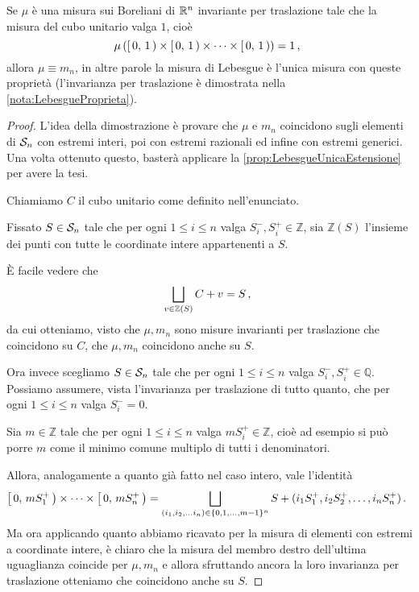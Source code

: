 \begin{theorem}\label{thm:LebesgueUnicaInvarianteTraslazione}
	Se $\mu$ è una misura sui Boreliani di $\R^n$ invariante per traslazione tale che la misura del cubo unitario valga $1$, cioè
	\begin{equation*}
		\mu\left(\co01\times\co01\times\cdots\times\co01\right)=1 \virgola
	\end{equation*}
	allora $\mu\equiv m_n$, in altre parole la misura di Lebesgue è l'unica misura con queste proprietà (l'invarianza per traslazione è dimostrata nella \cref{nota:LebesgueProprieta}).
\end{theorem}
\begin{proof}
	L'idea della dimostrazione è provare che $\mu$ e $m_n$ coincidono sugli elementi di $\S_n$ con estremi interi, poi con estremi razionali ed infine con estremi generici.
	Una volta ottenuto questo, basterà applicare la \cref{prop:LebesgueUnicaEstensione} per avere la tesi.
	
	Chiamiamo $C$ il cubo unitario come definito nell'enunciato.
	
	Fissato $S\in\S_n$ tale che per ogni $1\le i\le n$ valga $S^-_i,S^+_i\in \mathbb Z$, sia $\mathbb Z(S)$ l'insieme dei punti con tutte le coordinate intere appartenenti a $S$.
	
	È facile vedere che
	\begin{equation*}
		\bigsqcup_{v\in\mathbb Z(S)} C+v=S \virgola
	\end{equation*}
	da cui otteniamo, visto che $\mu,m_n$ sono misure invarianti per traslazione che coincidono su $C$, che $\mu,m_n$ coincidono anche su $S$.
	
	Ora invece scegliamo $S\in\S_n$ tale che per ogni $1\le i\le n$ valga $S^-_i,S^+_i\in \mathbb Q$. Possiamo assumere, vista l'invarianza per traslazione di tutto quanto, che per ogni $1\le i\le n$ valga $S^-_i=0$.
	
	Sia $m\in\mathbb Z$ tale che per ogni $1\le i\le n$ valga $mS^+_i\in \mathbb Z$, cioè ad esempio si può porre $m$ come il minimo comune multiplo di tutti i denominatori.
	
	Allora, analogamente a quanto già fatto nel caso intero, vale l'identità
	\begin{equation*}
		\co0{mS^+_1}\times\cdots\times\co0{mS^+_n}=
		\bigsqcup_{(i_1,i_2,\dots i_n)\in\mathbb \{0,1,\dots,m-1\}^n}S+(i_1S_1^+,i_2S_2^+,\dots,i_nS_n^+) \punto
	\end{equation*}
	Ma ora applicando quanto abbiamo ricavato per la misura di elementi con estremi a coordinate intere, è chiaro che la misura del membro destro dell'ultima uguaglianza coincide per $\mu,m_n$ e allora sfruttando ancora la loro invarianza per traslazione otteniamo che coincidono anche su $S$.
	

\end{proof}
